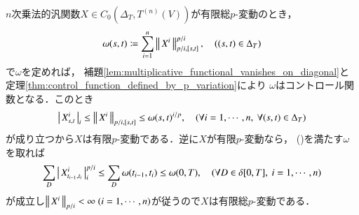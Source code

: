	\begin{prf}
		$n$次乗法的汎関数$X \in C_0 \left(\Delta_T,T^{(n)}(V) \right)$が有限総$p$-変動のとき，
		\begin{align}
			\omega(s,t) \coloneqq \sum_{i=1}^n \left\|\, X^i\, \right\|_{p/i,[s,t]}^{p/i},
			\quad ((s,t) \in \Delta_T)
		\end{align}
		で$\omega$を定めれば，
		補題\ref{lem:multiplicative_functional_vanishes_on_diagonal}と
		定理\ref{thm:control_function_defined_by_p_variation}により
		$\omega$はコントロール関数となる．このとき
		\begin{align}
			\left|\, X^i_{s,t}\, \right|_{i}
			\leq \left\|\, X^i\, \right\|_{p/i,[s,t]}
			\leq \omega(s,t)^{i/p},
			\quad (\forall i = 1,\cdots,n,\ \forall (s,t) \in \Delta_T)
		\end{align}
		が成り立つから$X$は有限$p$-変動である．逆に$X$が有限$p$-変動なら，
		()を満たす$\omega$を取れば
		\begin{align}
			\sum_D \left|\, X^i_{t_{i-1},t_i}\, \right|_{i}^{p/i}
			\leq \sum_D \omega(t_{i-1},t_i)
			\leq \omega(0,T),
			\quad (\forall D \in \delta[0,T],\ i=1,\cdots,n)
		\end{align}
		が成立し$\Norm{X^i}{p/i} < \infty\ (i=1,\cdots,n)$が従うので$X$は有限総$p$-変動である．
		\QED
	\end{prf}
	
